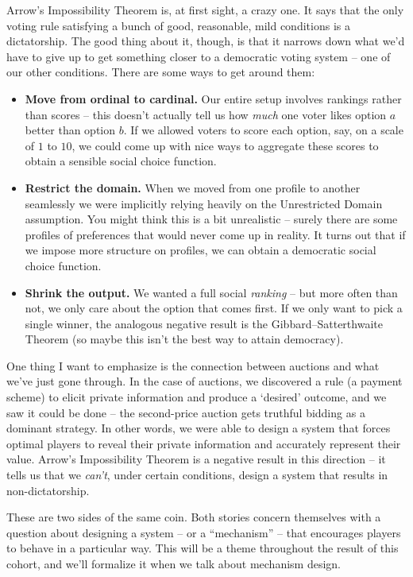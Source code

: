 \documentclass[12pt]{article}
\theoremstyle{definition}
\theoremstyle{remark}
\theoremstyle{plain}                          %
\begin{document}
Arrow's Impossibility Theorem is, at first sight, a crazy one. It says that the only voting rule satisfying a bunch of good, reasonable, mild conditions is a dictatorship. The good thing about it, though, is that it narrows down what we'd have to give up to get something closer to a democratic voting system -- one of our other conditions. There are some ways to get around them:
\begin{itemize}[nosep]
    \item \textbf{Move from ordinal to cardinal.} Our entire setup involves rankings rather than scores -- this doesn't actually tell us how \textit{much} one voter likes option $a$ better than option $b$. If we allowed voters to score each option, say, on a scale of $1$ to $10$, we could come up with nice ways to aggregate these scores to obtain a sensible social choice function.
    \item \textbf{Restrict the domain.} When we moved from one profile to another seamlessly we were implicitly relying heavily on the Unrestricted Domain assumption. You might think this is a bit unrealistic -- surely there are some profiles of preferences that would never come up in reality. It turns out that if we impose more structure on profiles, we can obtain a democratic social choice function.
    \item \textbf{Shrink the output.} We wanted a full social \emph{ranking} -- but more often than not, we only care about the option that comes first. If we only want to pick a single winner, the analogous negative result is the Gibbard--Satterthwaite Theorem (so maybe this isn't the best way to attain democracy).\\
\end{itemize}

\noindent
One thing I want to emphasize is the connection between auctions and what we've just gone through. In the case of auctions, we discovered a rule (a payment scheme) to elicit private information and produce a `desired' outcome, and we saw it could be done -- the second-price auction gets truthful bidding as a dominant strategy. In other words, we were able to design a system that forces optimal players to reveal their private information and accurately represent their value. Arrow's Impossibility Theorem is a negative result in this direction -- it tells us that we \textit{can't}, under certain conditions, design a system that results in non-dictatorship.

These are two sides of the same coin. Both stories concern themselves with a question about designing a system -- or a ``mechanism'' -- that encourages players to behave in a particular way. This will be a theme throughout the result of this cohort, and we'll formalize it when we talk about mechanism design.
\end{document}
